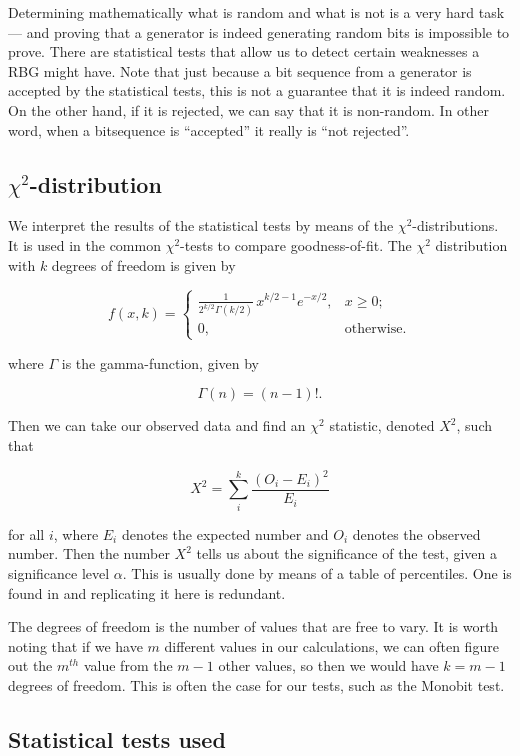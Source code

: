 \documentclass[a4paper]{article}           %
\begin{document}
Determining mathematically what is random and what is not is a very hard task --- and proving that a generator is indeed generating random bits is impossible to prove\cite{menezes1996}. There are statistical tests that allow us to detect certain weaknesses a RBG might have. Note that just because a bit sequence from a generator is accepted by the statistical tests, this is not a guarantee that it is indeed random. On the other hand, if it is rejected, we can say that it is non-random. In other word, when a bitsequence is ``accepted'' it really is ``not rejected''. 


\subsection{$\chi^2$-distribution}

We interpret the results of the statistical tests by means of the $\chi^2$-distributions. It is used in the common $\chi^2$-tests to compare goodness-of-fit. The $\chi^2$ distribution with $k$ degrees of freedom is given by

\[
f(x, k) =
\begin{cases}
  \frac{1}{2^{k/2}\Gamma(k/2)}\,x^{k/2 - 1} e^{-x/2},  & x \geq 0; \\ 0, & \text{otherwise}.
\end{cases}
\]

where $\Gamma$ is the gamma-function, given by

\[
\Gamma(n) = (n-1)!.
\]

Then we can take our observed data and find an $\chi^2$ statistic, denoted $X^2$, such that

\[
X^2 = \sum_i^k \frac{(O_i - E_i)^2}{E_i}
\]

for all $i$, where $E_i$ denotes the expected number and $O_i$ denotes the observed number. Then the number $X^2$ tells us about the significance of the test, given a significance level $\alpha$. This is usually done by means of a table of percentiles. One is found in \cite[p. 178]{menezes1996} and replicating it here is redundant. 

The degrees of freedom is the number of values that are free to vary. It is worth noting that if we have $m$ different values in our calculations, we can often figure out the $m^{th}$ value from the $m-1$ other values, so then we would have $k=m-1$ degrees of freedom. This is often the case for our tests, such as the Monobit test. 

\subsection{Statistical tests used}
\label{sec:stattests}
\end{document}
